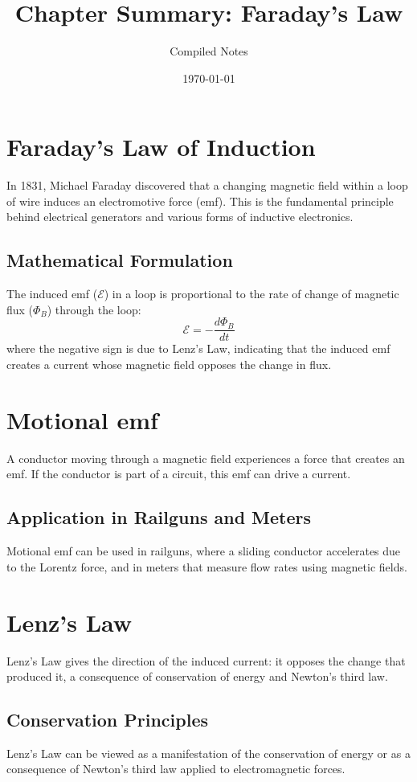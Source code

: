 \documentclass{article}
\title{Chapter Summary: Faraday's Law}
\author{Compiled Notes}
\date{\today}
\begin{document}
\maketitle

\section{Faraday's Law of Induction}
In 1831, Michael Faraday discovered that a changing magnetic field within a loop of wire induces an electromotive force (emf). This is the fundamental principle behind electrical generators and various forms of inductive electronics.

\subsection{Mathematical Formulation}
The induced emf ($\mathcal{E}$) in a loop is proportional to the rate of change of magnetic flux ($\Phi_B$) through the loop:
\begin{equation}
    \mathcal{E} = -\frac{d\Phi_B}{dt}
\end{equation}
where the negative sign is due to Lenz's Law, indicating that the induced emf creates a current whose magnetic field opposes the change in flux.

\section{Motional emf}
A conductor moving through a magnetic field experiences a force that creates an emf. If the conductor is part of a circuit, this emf can drive a current.

\subsection{Application in Railguns and Meters}
Motional emf can be used in railguns, where a sliding conductor accelerates due to the Lorentz force, and in meters that measure flow rates using magnetic fields.

\section{Lenz's Law}
Lenz's Law gives the direction of the induced current: it opposes the change that produced it, a consequence of conservation of energy and Newton's third law.

\subsection{Conservation Principles}
Lenz's Law can be viewed as a manifestation of the conservation of energy or as a consequence of Newton's third law applied to electromagnetic forces.
\end{document}
